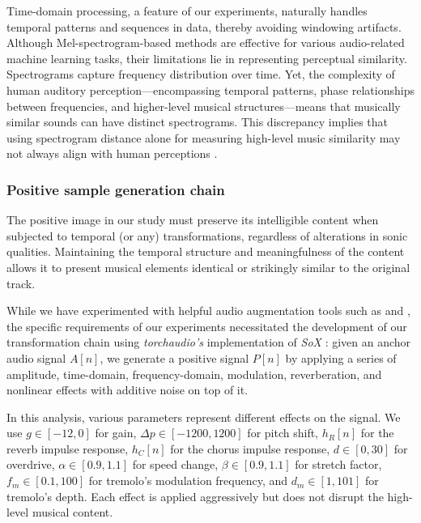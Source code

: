 Time-domain processing, a feature of our experiments, naturally handles temporal patterns and sequences in data, thereby avoiding windowing artifacts. Although Mel-spectrogram-based methods are effective for various audio-related machine learning tasks, their limitations lie in representing perceptual similarity. Spectrograms capture frequency distribution over time. Yet, the complexity of human auditory perception—encompassing temporal patterns, phase relationships between frequencies, and higher-level musical structures—means that musically similar sounds can have distinct spectrograms. This discrepancy implies that using spectrogram distance alone for measuring high-level music similarity may not always align with human perceptions \cite{Kim2020OneStrategies}\cite{Mesostructures2023}.

\subsubsection{Positive sample generation chain}

The positive image in our study must preserve its intelligible content when subjected to temporal (or any) transformations, regardless of alterations in sonic qualities. Maintaining the temporal structure and meaningfulness of the content allows it to present musical elements identical or strikingly similar to the original track.

While we have experimented with helpful audio augmentation tools such as \cite{Spijkervet2021Spijkervet/torchaudio-augmentations:V1.0} and \cite{Kharitonov2020DataDomain}, the specific requirements of our experiments necessitated the development of our transformation chain using \textit{torchaudio's} \cite{Yang2021TorchAudio:Processing} implementation of \textit{SoX} \cite{sox}: given an anchor audio signal $A[n]$, we generate a positive signal $P[n]$ by applying a series of amplitude, time-domain, frequency-domain, modulation, reverberation, and nonlinear effects with additive noise on top of it. 

In this analysis, various parameters represent different effects on the signal. We use $g \in [-12, 0]$ for gain, $\Delta p \in [-1200, 1200]$ for pitch shift, $h_R[n]$ for the reverb impulse response, $h_C[n]$ for the chorus impulse response, $d \in [0, 30]$ for overdrive, $\alpha \in [0.9, 1.1]$ for speed change, $\beta \in [0.9, 1.1]$ for stretch factor, $f_m \in [0.1, 100]$ for tremolo's modulation frequency, and $d_m \in [1, 101]$ for tremolo's depth. Each effect is applied aggressively but does not disrupt the high-level musical content.

